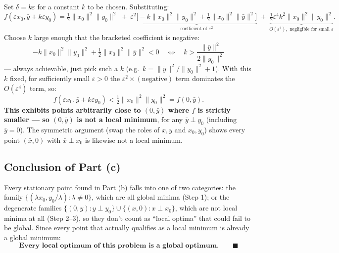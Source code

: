 \documentclass[11pt]{article}
\begin{document}
Set $\delta = k\varepsilon$ for a constant $k$ to be chosen. Substituting:
\[
f(\varepsilon x_0,\bar y+k\varepsilon y_0) = \tfrac12\|x_0\|^2\|y_0\|^2 \;+\; \varepsilon^2\underbrace{\Big[-k\|x_0\|^2\|y_0\|^2+\tfrac12\|x_0\|^2\|\bar y\|^2\Big]}_{\text{coefficient of }\varepsilon^2} \;+\; \underbrace{\tfrac12\varepsilon^4k^2\|x_0\|^2\|y_0\|^2}_{O(\varepsilon^4),\text{ negligible for small }\varepsilon}.
\]
Choose $k$ large enough that the bracketed coefficient is negative:
\[
-k\|x_0\|^2\|y_0\|^2+\tfrac12\|x_0\|^2\|\bar y\|^2 < 0 \quad\Longleftrightarrow\quad k > \frac{\|\bar y\|^2}{2\|y_0\|^2}
\]
--- always achievable, just pick such a $k$ (e.g.\ $k = \|\bar y\|^2/\|y_0\|^2+1$). With this $k$ fixed, for sufficiently small $\varepsilon>0$ the $\varepsilon^2\times(\text{negative})$ term dominates the $O(\varepsilon^4)$ term, so:
\[
f(\varepsilon x_0,\bar y+k\varepsilon y_0) < \tfrac12\|x_0\|^2\|y_0\|^2 = f(0,\bar y).
\]
\textbf{This exhibits points arbitrarily close to $(0,\bar y)$ where $f$ is strictly smaller --- so $(0,\bar y)$ is not a local minimum}, for any $\bar y\perp y_0$ (including $\bar y=0$). The symmetric argument (swap the roles of $x,y$ and $x_0,y_0$) shows every point $(\bar x,0)$ with $\bar x\perp x_0$ is likewise not a local minimum.

\subsection*{Conclusion of Part (c)}

Every stationary point found in Part (b) falls into one of two categories: the family $\{(\lambda x_0,y_0/\lambda):\lambda\ne0\}$, which are all global minima (Step 1); or the degenerate families $\{(0,y):y\perp y_0\}\cup\{(x,0):x\perp x_0\}$, which are not local minima at all (Step 2--3), so they don't count as ``local optima'' that could fail to be global. Since every point that actually qualifies as a local minimum is already a global minimum:
\[
\textbf{Every local optimum of this problem is a global optimum.} \qquad\blacksquare
\]
\end{document}
